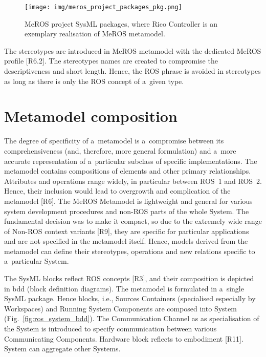\documentclass[11pt,oneside,a4paper]{report}
\begin{document}
		
	\begin{figure}[H]
		\centering
		\begin{center}
			{\texttt{[image: img/meros\_project\_packages\_pkg.png]}}
		\end{center}
		\caption{MeROS project SysML packages, where Rico Controller is an exemplary realisation of MeROS metamodel.} 
		\label{fig:meros_project_packages_pkg}
	\end{figure}
	
	The stereotypes are introduced in MeROS metamodel with the dedicated MeROS profile [R6.2].
	The stereotypes names are created to compromise the descriptiveness and short length. Hence, the ROS phrase is avoided in stereotypes as long as there is only the ROS concept of a~given type.
	
	
	
\section{Metamodel composition}
\label{sec:metamodel-composition}

	The degree of specificity of a~metamodel is a~compromise between its comprehensiveness (and, therefore, more general formulation) and a~more accurate representation of a~particular subclass of specific implementations. The metamodel contains compositions of elements and other primary relationships. Attributes and operations range widely, in particular between ROS~1 and ROS~2. Hence, their inclusion would lead to overgrowth and complication of the metamodel [R6]. The MeROS Metamodel is lightweight and general for various system development procedures and non-ROS parts of the whole System. The fundamental decision was to make it compact, so due to the extremely wide range of Non-ROS context variants [R9], they are specific for particular applications and are not specified in the metamodel itself.
	Hence, models derived from the metamodel can define their stereotypes, operations and new relations specific to a~particular System. 
	
	
	The SysML blocks reflect ROS concepts [R3], and their composition is depicted in bdd (block definition diagrams). The metamodel is formulated in a~single SysML package. Hence blocks, i.e., Sources Containers (specialised especially by Workspaces) and Running System Components are composed into System (Fig.~\ref{fig:ros_system_bdd}). The Communication Channel as as specialisation of the System is introduced to specify communication between various Communicating Components. Hardware block reflects to embodiment [R11]. System can aggregate other Systems.
	
\end{document}
